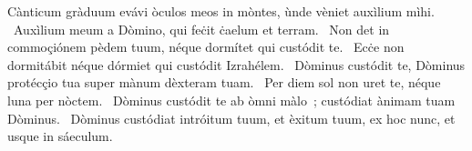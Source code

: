 { Cànticum gràduum}
{%
evávi òculos meos in mòntes, ùnde vèniet auxìlium mìhi. 
~Auxìlium meum a Dòmino, qui feċit ċaelum et terram. 
~Non det in commoçiónem pèdem tuum, néque dormítet qui custódit te. 
~Ecċe non dormitábit néque dórmiet qui custódit Izrahélem. 
~Dòminus custódit te, Dòminus protécçio tua super mànum dèxteram tuam. 
~Per diem sol non uret te, néque luna per nòctem. 
~Dòminus custódit te ab òmni màlo~; custódiat ànimam tuam Dòminus. 
~Dòminus custódiat intróitum tuum, et èxitum tuum, ex hoc nunc, et usque in sáeculum. 
}
